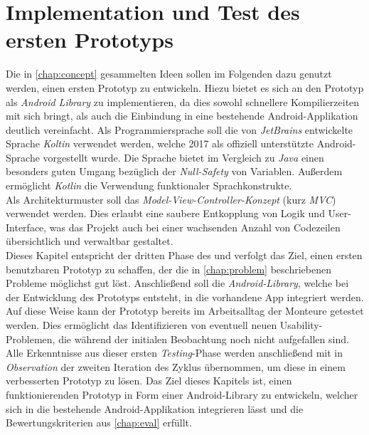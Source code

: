\chapter{Implementation und Test des ersten Prototyps}

Die in \autoref{chap:concept} gesammelten Ideen sollen im Folgenden dazu genutzt werden, einen ersten Prototyp zu entwickeln.
Hiezu bietet es sich an den Prototyp als \emph{Android Library} zu implementieren, da dies sowohl schnellere Kompilierzeiten mit sich bringt, als auch die Einbindung in eine bestehende Android-Applikation deutlich vereinfacht.
Als Programmiersprache soll die von \emph{JetBrains} entwickelte Sprache \emph{Koltin} verwendet werden, welche 2017 als offiziell unterstützte Android-Sprache vorgestellt wurde.
Die Sprache bietet im Vergleich zu \emph{Java} einen besonders guten Umgang bezüglich der \emph{Null-Safety} von Variablen.
Außerdem ermöglicht \emph{Kotlin} die Verwendung funktionaler Sprachkonstrukte. \\

Als Architekturmuster soll das \emph{Model-View-Controller-Konzept} (kurz \emph{MVC}) verwendet werden. 
Dies erlaubt eine saubere Entkopplung von Logik und User-Interface, was das Projekt auch bei einer wachsenden Anzahl von Codezeilen übersichtlich und verwaltbar gestaltet. \\

Dieses Kapitel entspricht der dritten Phase des \hcdp{} und verfolgt das Ziel, einen ersten benutzbaren Prototyp zu schaffen, der die in \autoref{chap:problem} beschriebenen Probleme möglichst gut löst. 
Anschließend soll die \emph{Android-Library}, welche bei der Entwicklung des Prototyps entsteht, in die vorhandene App integriert werden.
Auf diese Weise kann der Prototyp bereits im Arbeitsalltag der Monteure getestet werden.
Dies ermöglicht das Identifizieren von eventuell neuen Usability-Problemen, die während der initialen Beobachtung noch nicht aufgefallen sind. \\

Alle Erkenntnisse aus dieser ersten \emph{Testing}-Phase werden anschließend mit in \emph{Observation} der zweiten Iteration des \hcdp{} Zyklus übernommen, um diese in einem verbesserten Prototyp zu lösen.
Das Ziel dieses Kapitels ist, einen funktionierenden Prototyp in Form einer Android-Library zu entwickeln, welcher sich in die bestehende Android-Applikation integrieren lässt und die Bewertungskriterien aus \autoref{chap:eval} erfüllt.





